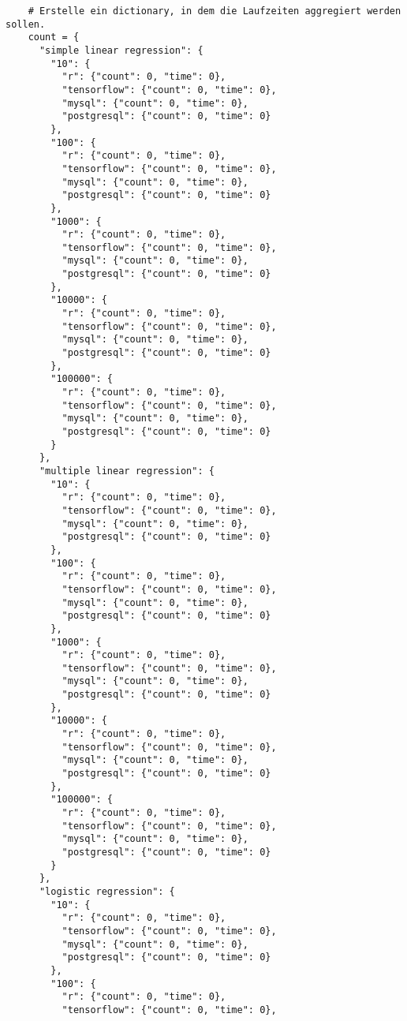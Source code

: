 \begin{verbatim}
    # Erstelle ein dictionary, in dem die Laufzeiten aggregiert werden sollen.
    count = {
      "simple linear regression": {
        "10": {
          "r": {"count": 0, "time": 0},
          "tensorflow": {"count": 0, "time": 0},
          "mysql": {"count": 0, "time": 0},
          "postgresql": {"count": 0, "time": 0}
        },
        "100": {
          "r": {"count": 0, "time": 0},
          "tensorflow": {"count": 0, "time": 0},
          "mysql": {"count": 0, "time": 0},
          "postgresql": {"count": 0, "time": 0}
        },
        "1000": {
          "r": {"count": 0, "time": 0},
          "tensorflow": {"count": 0, "time": 0},
          "mysql": {"count": 0, "time": 0},
          "postgresql": {"count": 0, "time": 0}
        },
        "10000": {
          "r": {"count": 0, "time": 0},
          "tensorflow": {"count": 0, "time": 0},
          "mysql": {"count": 0, "time": 0},
          "postgresql": {"count": 0, "time": 0}
        },
        "100000": {
          "r": {"count": 0, "time": 0},
          "tensorflow": {"count": 0, "time": 0},
          "mysql": {"count": 0, "time": 0},
          "postgresql": {"count": 0, "time": 0}
        }
      },
      "multiple linear regression": {
        "10": {
          "r": {"count": 0, "time": 0},
          "tensorflow": {"count": 0, "time": 0},
          "mysql": {"count": 0, "time": 0},
          "postgresql": {"count": 0, "time": 0}
        },
        "100": {
          "r": {"count": 0, "time": 0},
          "tensorflow": {"count": 0, "time": 0},
          "mysql": {"count": 0, "time": 0},
          "postgresql": {"count": 0, "time": 0}
        },
        "1000": {
          "r": {"count": 0, "time": 0},
          "tensorflow": {"count": 0, "time": 0},
          "mysql": {"count": 0, "time": 0},
          "postgresql": {"count": 0, "time": 0}
        },
        "10000": {
          "r": {"count": 0, "time": 0},
          "tensorflow": {"count": 0, "time": 0},
          "mysql": {"count": 0, "time": 0},
          "postgresql": {"count": 0, "time": 0}
        },
        "100000": {
          "r": {"count": 0, "time": 0},
          "tensorflow": {"count": 0, "time": 0},
          "mysql": {"count": 0, "time": 0},
          "postgresql": {"count": 0, "time": 0}
        }
      },
      "logistic regression": {
        "10": {
          "r": {"count": 0, "time": 0},
          "tensorflow": {"count": 0, "time": 0},
          "mysql": {"count": 0, "time": 0},
          "postgresql": {"count": 0, "time": 0}
        },
        "100": {
          "r": {"count": 0, "time": 0},
          "tensorflow": {"count": 0, "time": 0},

\end{verbatim}
